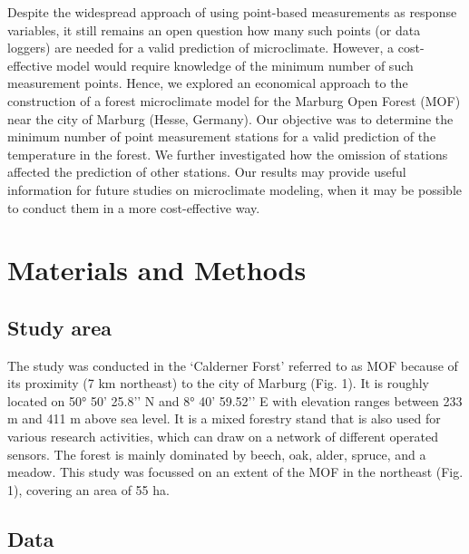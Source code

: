 \documentclass[5p]{elsarticle} %
\begin{document}
Despite the widespread approach of using point-based measurements as response variables, it still remains an open question how many such points (or data loggers) are needed for a valid prediction of microclimate. However, a cost-effective model would require knowledge of the minimum number of such measurement points. Hence, we explored an economical approach to the construction of a forest microclimate model for the Marburg Open Forest (MOF) near the city of Marburg (Hesse, Germany). Our objective was to determine the minimum number of point measurement stations for a valid prediction of the temperature in the forest. We further investigated how the omission of stations affected the prediction of other stations. Our results may provide useful information for future studies on microclimate modeling, when it may be possible to conduct them in a more cost-effective way.


\hypertarget{materials-and-methods}{%
\section{Materials and Methods}\label{materials-and-methods}}

\hypertarget{study-area}{%
\subsection{\texorpdfstring{Study area\\
}{Study area }}\label{study-area}}

The study was conducted in the ‘Calderner Forst’ referred to as MOF because of its proximity (7 km northeast) to the city of Marburg (Fig. 1). It is roughly located on 50° 50’ 25.8’’ N and 8° 40’ 59.52’’ E with elevation ranges between 233 m and 411 m above sea level. It is a mixed forestry stand that is also used for various research activities, which can draw on a network of different operated sensors. The forest is mainly dominated by beech, oak, alder, spruce, and a meadow. This study was focussed on an extent of the MOF in the northeast (Fig. 1), covering an area of 55 ha.


\hypertarget{data}{%
\subsection{\texorpdfstring{Data\\
}{Data }}\label{data}}
\end{document}

